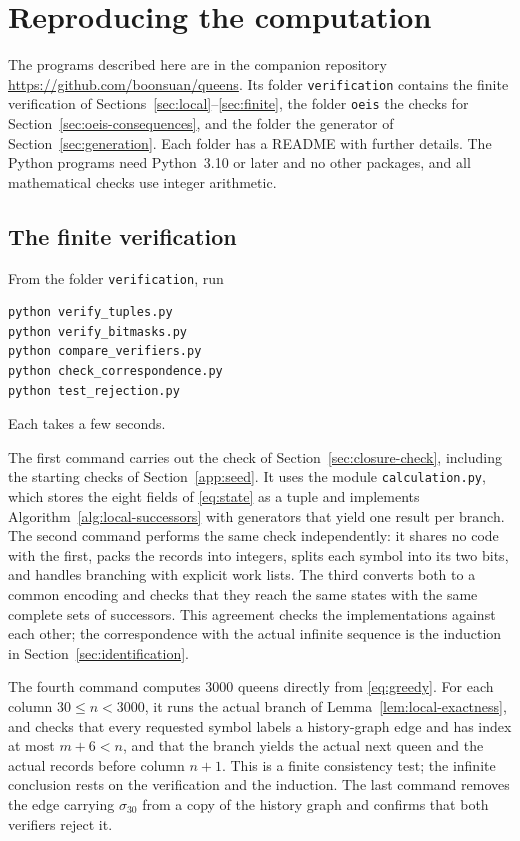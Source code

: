 \section{Reproducing the computation}\label{app:artifacts}
The programs described here are in the companion repository
\url{https://github.com/boonsuan/queens}. Its folder
\texttt{verification} contains the finite verification of
Sections~\ref{sec:local}--\ref{sec:finite}, the folder \texttt{oeis}
the checks for Section~\ref{sec:oeis-consequences}, and the folder
 the generator of Section~\ref{sec:generation}.
Each folder has a README with further details. The Python programs
need Python~3.10 or later and no other packages, and all
mathematical checks use integer arithmetic.

\subsection{The finite verification}\label{app:verification}
From the folder \texttt{verification}, run
\begin{verbatim}
python verify_tuples.py
python verify_bitmasks.py
python compare_verifiers.py
python check_correspondence.py
python test_rejection.py
\end{verbatim}
Each takes a few seconds.

The first command carries out the check of
Section~\ref{sec:closure-check}, including the starting checks of
Section~\ref{app:seed}. It uses the module \texttt{calculation.py},
which stores the eight fields of \eqref{eq:state} as a tuple and
implements Algorithm~\ref{alg:local-successors} with generators that
yield one result per branch. The second command
performs the same check independently: it shares no code with the
first, packs the records into integers, splits each symbol into its
two bits, and handles branching with explicit work lists. The third
converts both to a common encoding and checks that they reach the same
states with the same complete sets of successors. This agreement
checks the implementations against each other; the correspondence
with the actual infinite sequence is the induction in
Section~\ref{sec:identification}.

The fourth command computes $3000$ queens directly from
\eqref{eq:greedy}. For each column $30\le n<3000$, it runs the actual
branch of Lemma~\ref{lem:local-exactness}, and checks
that every requested symbol labels a history-graph edge and has index
at most $m+6<n$, and that the branch yields the actual next queen and
the actual records before column $n+1$. This is a finite consistency
test; the infinite conclusion rests on the verification and the
induction. The last command removes the edge carrying $\sigma_{30}$
from a copy of the history graph and confirms that both verifiers
reject it.

